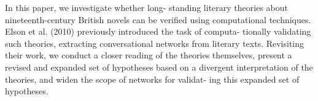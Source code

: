 In this paper, we investigate whether long- standing literary theories about nineteenth-century British novels can be verified using computational techniques. Elson et al. (2010) previously introduced the task of computa- tionally validating such theories, extracting conversational networks from literary texts. Revisiting their work, we conduct a closer reading of the theories themselves, present a revised and expanded set of hypotheses based on a divergent interpretation of the theories, and widen the scope of networks for validat- ing this expanded set of hypotheses.
